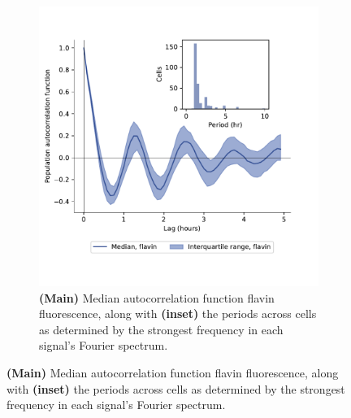 \begin{figure}
\begin{subfigure}[htpb]{0.4\textwidth}
   \includegraphics[width=\textwidth]{by4741_491_12}
   \caption{
     \textbf{(Main)} Median autocorrelation function flavin fluorescence, %
     along with \textbf{(inset)} the periods across cells as determined by the strongest frequency in each signal's Fourier spectrum.
   }
   \label{fig:biology-by4741-sync-acf}
  \end{subfigure}



\end{figure}
